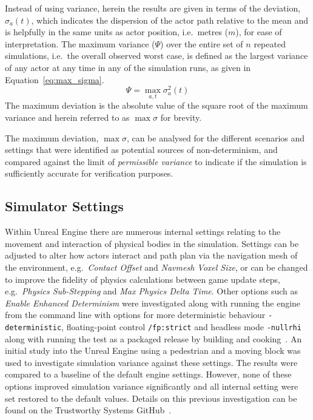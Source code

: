 Instead of using variance, herein the results are given in terms of the deviation, $\sigma_a(t)$, which indicates the dispersion of the actor path relative to the mean and is helpfully in the same units as actor position, i.e.\ metres ($m$), for ease of interpretation. The maximum variance ($\Psi$) over the entire set of $n$ repeated simulations, i.e.\ the overall observed worst case, is defined as the largest variance of any actor at any time in any of the simulation runs, as given in Equation~\ref{eq:max_sigma}. 
\begin{equation} \label{eq:max_sigma}
\Psi = \max_{a,t}\sigma_a^{2}(t)
\end{equation}
The maximum deviation is the absolute value of the square root of the maximum variance and herein referred to as ${\max\sigma}$ for brevity. 

The maximum deviation, $\max\sigma$, can be analysed for the different scenarios and settings that were identified as potential sources of non-determinism, and compared against the limit of \textit{permissible variance} to indicate if the simulation is sufficiently accurate for verification purposes.


\subsection{Simulator Settings}

Within Unreal Engine there are numerous internal settings relating to the movement and interaction of physical bodies in the simulation. Settings can be adjusted to alter how actors interact and path plan via the navigation mesh of the environment, e.g.\ \textit{Contact Offset} and \textit{Navmesh Voxel Size}, or can be changed to improve the fidelity of physics calculations between game update steps, e.g.\ \textit{Physics Sub-Stepping} and \textit{Max Physics Delta Time}. Other options such as \textit{Enable Enhanced Determinism} were investigated along with running the engine from the command line with options for more deterministic behaviour \texttt{-deterministic}, floating-point control \texttt{/fp:strict} and headless mode \texttt{-nullrhi} along with running the test as a packaged release by building and cooking~\cite{releasing_project}. An initial study into the Unreal Engine using a pedestrian and a moving block was used to investigate simulation variance against these settings. The results were compared to a baseline of the default engine settings. However, none of these options improved simulation variance significantly and all internal setting were set restored to the default values. Details on this previous investigation can be found on the Trustworthy Systems GitHub~\cite{TSLUnrealEngineTesting}. 

